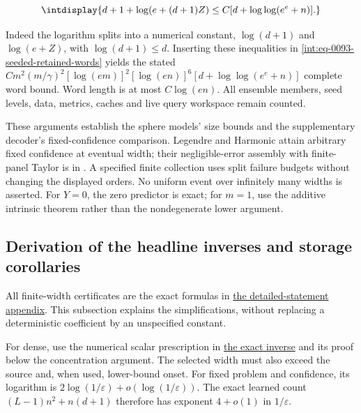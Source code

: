 \begingroup\renewcommand{\theHequation}{intdisplay.825}
\begin{equation}
\intdisplay{
d+1+\log(e+(d+1)Z)
\le C[d+\log\log(e^e+n)].
}
\label{int:eq-0402-joint-decoder-logarithm}
\end{equation}
\endgroup


Indeed the logarithm splits into a numerical constant, \(\log(d+1)\) and \(\log(e+Z)\), with \(\log(d+1)\le d\). Inserting these inequalities in \eqref{int:eq-0093-seeded-retained-words} yields the stated \(Cm^2(m/\gamma)^2[\log(em)]^2[\log(en)]^6 [d+\log\log(e^e+n)]\) complete word bound. Word length is at most \(C\log(en)\). All ensemble members, seed levels, data, metrics, caches and live query workspace remain counted.



These arguments establish the sphere models' size bounds and the supplementary decoder's fixed-confidence comparison. Legendre and Harmonic attain arbitrary fixed confidence at eventual width; their negligible-error assembly with finite-panel Taylor is in . A specified finite collection uses split failure budgets without changing the displayed orders. No uniform event over infinitely many widths is asserted. For \(Y=0\), the zero predictor is exact; for \(m=1\), use the additive intrinsic theorem rather than the nondegenerate lower argument.


\subsection{Derivation of the headline inverses and storage corollaries}
\label{int:headline-corollary-proofs}


All finite-width certificates are the exact formulas in \hyperref[int:detailed-statements]{the detailed-statement appendix}. This subsection explains the simplifications, without replacing a deterministic coefficient by an unspecified constant.



For dense, use the numerical scalar prescription in \hyperref[int:dense-inverse-storage]{the exact inverse} and its proof below the concentration argument. The selected width must also exceed the source and, when used, lower-bound onset. For fixed problem and confidence, its logarithm is \(2\log(1/\varepsilon)+o(\log(1/\varepsilon))\). The exact learned count \((L-1)n^2+n(d+1)\) therefore has exponent \(4+o(1)\) in \(1/\varepsilon\).


